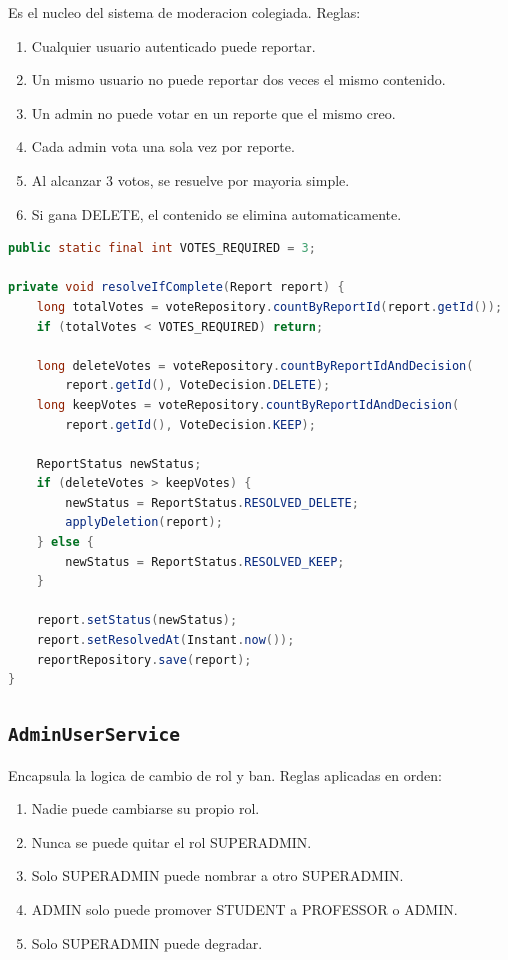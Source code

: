 Es el nucleo del sistema de moderacion colegiada. Reglas:

\begin{enumerate}[leftmargin=*]
  \item Cualquier usuario autenticado puede reportar.
  \item Un mismo usuario no puede reportar dos veces el mismo contenido.
  \item Un admin no puede votar en un reporte que el mismo creo.
  \item Cada admin vota una sola vez por reporte.
  \item Al alcanzar 3 votos, se resuelve por mayoria simple.
  \item Si gana DELETE, el contenido se elimina automaticamente.
\end{enumerate}

\begin{lstlisting}[language=Java]
public static final int VOTES_REQUIRED = 3;

private void resolveIfComplete(Report report) {
    long totalVotes = voteRepository.countByReportId(report.getId());
    if (totalVotes < VOTES_REQUIRED) return;

    long deleteVotes = voteRepository.countByReportIdAndDecision(
        report.getId(), VoteDecision.DELETE);
    long keepVotes = voteRepository.countByReportIdAndDecision(
        report.getId(), VoteDecision.KEEP);

    ReportStatus newStatus;
    if (deleteVotes > keepVotes) {
        newStatus = ReportStatus.RESOLVED_DELETE;
        applyDeletion(report);
    } else {
        newStatus = ReportStatus.RESOLVED_KEEP;
    }

    report.setStatus(newStatus);
    report.setResolvedAt(Instant.now());
    reportRepository.save(report);
}
\end{lstlisting}

\subsection{\texttt{AdminUserService}}

Encapsula la logica de cambio de rol y ban. Reglas aplicadas en orden:

\begin{enumerate}[leftmargin=*]
  \item Nadie puede cambiarse su propio rol.
  \item Nunca se puede quitar el rol SUPERADMIN.
  \item Solo SUPERADMIN puede nombrar a otro SUPERADMIN.
  \item ADMIN solo puede promover STUDENT a PROFESSOR o ADMIN.
  \item Solo SUPERADMIN puede degradar.
\end{enumerate}

